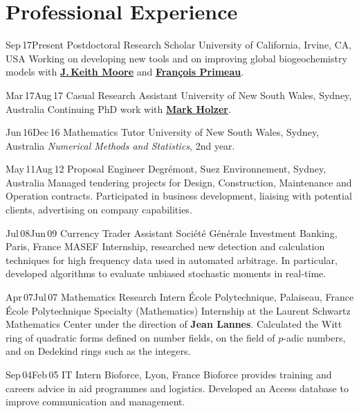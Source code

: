 \documentclass[12pt]{friggeri-cv}
\begin{document}
\section{Professional {\color{pblue}Exp}erience}
\begin{entrylist}
  \entry
    {Sep$\,$17\textemdash{}Present}
    {Postdoctoral Research Scholar}
    {University of California, Irvine, CA, USA}
    {Working on developing new tools and on improving global biogeochemistry models with \hyperref[JKM]{\textbf{J.\,Keith Moore}} and \hyperref[FP]{\textbf{Fran\c{c}ois Primeau}}.}

  \entry
    {Mar$\,$17\textemdash{}Aug$\,$17}
    {Casual Research Assistant}
    {University of New South Wales, Sydney, Australia}
    {Continuing PhD work with \hyperref[MH]{\textbf{Mark Holzer}}.
    }

  \entry
    {Jun$\,$16\textemdash{}Dec$\,$16}
    {Mathematics Tutor}
    {University of New South Wales, Sydney, Australia}
    {\emph{Numerical Methods and Statistics}, 2nd year.
    }

  \entry
    {May$\,$11\textemdash{}Aug$\,$12}
    {Proposal Engineer}
    {Degr\'{e}mont, Suez Environnement, Sydney, Australia}
    {Managed tendering projects for Design, Construction, Maintenance and Operation contracts.
    Participated in business development, liaising with potential clients, advertising on company capabilities.
    }

  \entry
    {Jul$\,$08\textemdash{}Jun$\,$09}
    {Currency Trader Assistant}
    {Soci\'{e}t\'{e} G\'{e}n\'{e}rale Investment Banking, Paris, France}
    {MASEF Internship, researched new detection and calculation techniques for high frequency data used in automated arbitrage.
    In particular, developed algorithms to evaluate unbiased stochastic moments in real-time.
    }


  \entry
    {Apr$\,$07\textemdash{}Jul$\,$07}
    {Mathematics Research Intern}
    {\'{E}cole Polytechnique, Palaiseau, France}
    {\'{E}cole Polytechnique Specialty (Mathematics) Internship at the Laurent Schwartz Mathematics Center under the direction of \textbf{Jean Lannes}. Calculated the Witt ring of quadratic forms defined on number fields, on the field of $p$-adic numbers, and on Dedekind rings such as the integers.
    }


  \entry
  {Sep$\,$04\textemdash{}Feb$\,$05}
    {IT Intern}
    {Bioforce, Lyon, France}
    {Bioforce provides training and careers advice in aid programmes and logistics. Developed an Access database to improve communication and management.
    }

\end{entrylist}
\end{document}
